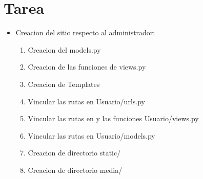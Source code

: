 \documentclass{article}
\begin{document}
	\section{Tarea}
	\begin{itemize}
		\item Creacion del sitio respecto al administrador:
        \begin{enumerate}
            \item Creacion del models.py
            \item Creacion de las funciones de views.py
            \item Creacion de Templates
            \item Vincular las rutas en Usuario/urls.py
            \item Vincular las rutas en y las funciones Usuario/views.py
            \item Vincular las rutas en Usuario/models.py
            \item Creacion de directorio static/
            \item Creacion de directorio media/
        \end{enumerate}
        \end{itemize}
\end{document}
